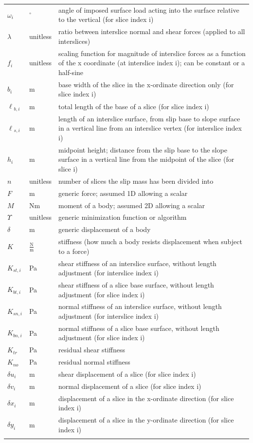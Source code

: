 \documentclass[12pt]{article}
\begin{document}
\begin{longtable*}{l l l}
\\
$\omega{}_{i}$ & ${}^{\circ}$ & angle of imposed surface load acting into the surface relative to the vertical (for slice index i)
\\
$\lambda{}$ & unitless & ratio between interslice normal and shear forces (applied to all interslices)
\\
$f_{i}$ & unitless & scaling function for magnitude of interslice forces as a function of the x coordinate (at interslice index i); can be constant or a half-sine
\\
$b_{i}$ & m & base width of the slice in the x-ordinate direction only (for slice index i)
\\
$\ell{}_{b,i}$ & m & total length of the base of a slice (for slice index i)
\\
$\ell{}_{s,i}$ & m & length of an interslice surface, from slip base to slope surface in a vertical line from an interslice vertex (for interslice index i)
\\
$h_{i}$ & m & midpoint height; distance from the slip base to the slope surface in a vertical line from the midpoint of the slice (for slice i)
\\
$n$ & unitless & number of slices the slip mass has been divided into
\\
$F$ & m & generic force; assumed 1D allowing a scalar
\\
$M$ & Nm & moment of a body; assumed 2D allowing a scalar
\\
$\Upsilon{}$ & unitless & generic minimization function or algorithm
\\
$\delta{}$ & m & generic displacement of a body
\\
$K$ & $\frac{\text{N}}{\text{m}}$ & stiffness (how much a body resists displacement when subject to a force)
\\
$K_{st,i}$ & Pa & shear stiffness of an interslice surface, without length adjustment (for interslice index i)
\\
$K_{bt,i}$ & Pa & shear stiffness of a slice base surface, without length adjustment (for slice index i)
\\
$K_{sn,i}$ & Pa & normal stiffness of an interslice surface, without length adjustment (for interslice index i)
\\
$K_{bn,i}$ & Pa & normal stiffness of a slice base surface, without length adjustment (for slice index i)
\\
$K_{tr}$ & Pa & residual shear stiffness
\\
$K_{no}$ & Pa & residual normal stiffness
\\
$\delta{}u_{i}$ & m & shear displacement of a slice (for slice index i)
\\
$\delta{}v_{i}$ & m & normal displacement of a slice (for slice index i)
\\
$\delta{}x_{i}$ & m & displacement of a slice in the x-ordinate direction (for slice index i)
\\
$\delta{}y_{i}$ & m & displacement of a slice in the y-ordinate direction (for slice index i)
\\
\bottomrule
\label{Table:ToS}
\end{longtable*}
\end{document}
